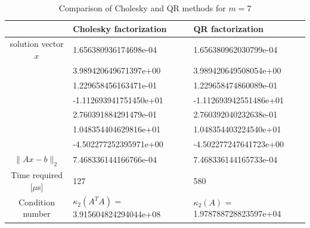 \documentclass[11pt]{article} %
\begin{document}
\begin{table}[h!]
\centering
\begin{tabular}{| c | l | l | }\hline
 & Cholesky factorization & QR factorization \\ \hline
solution vector $x$ &   1.656380936174698e-04  &         1.656380962030799e-04\\
&    3.989420649671397e+00  &      3.989420649508054e+00     \\
&     1.229658456163471e-01  &      1.229658474860089e-01     \\
&    -1.112693941751450e+01  &      -1.112693942551486e+01    \\
&     2.760391884291479e-01  &        2.760392040232638e-01   \\
&     1.048354404629816e+01  &      1.048354403224540e+01  \\ 
&    -4.502277252395971e+00 &     -4.502277247641723e+00\\ \hline
 $\|Ax - b \|_2$ &     7.468336144166766e-04 &       7.468336144165733e-04
  \\ \hline
Time required [$\mu$s] &  127 & 580 \\ \hline
Condition number & $\kappa_2(A^T A )$ =     3.915604824294044e+08 & $\kappa_2(A )$ =       1.978788728823597e+04
 \\ \hline
\end{tabular}
\caption{Comparison of Cholesky and QR methods for $m=7$}
\end{table}
\end{document}
